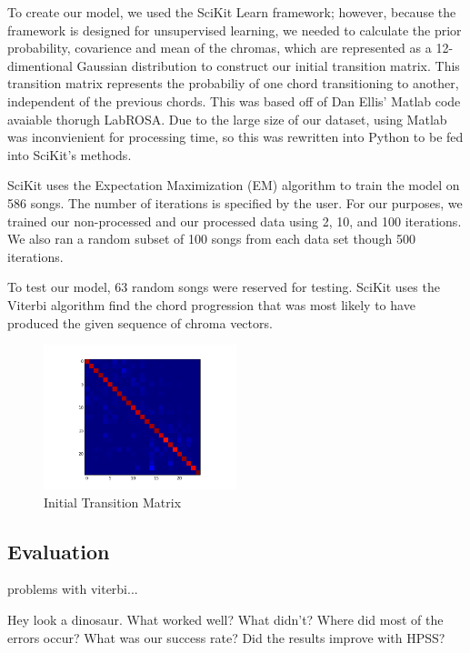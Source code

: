 \documentclass{article}
\begin{document}
To create our model, we used the SciKit Learn framework; however, because the
framework is designed for unsupervised learning, we needed to calculate the
prior probability, covarience and mean of the chromas, which are represented as
a 12-dimentional Gaussian distribution to construct our initial transition
matrix.  This transition matrix represents the probabiliy of one chord
transitioning to another, independent of the previous chords.  This was based
off of Dan Ellis' Matlab code avaiable thorugh LabROSA. Due to the large size
of our dataset, using Matlab was inconvienient for processing time, so this was
rewritten into Python to be fed into SciKit's methods.

SciKit uses the Expectation Maximization (EM) algorithm to train the model on
586 songs. The number of iterations is specified by the user. For our purposes,
we trained our non-processed and our processed data using 2, 10, and 100
iterations. We also ran a random subset of 100 songs from each data set though
500 iterations.

To test our model, 63 random songs were reserved for testing. SciKit uses the
Viterbi algorithm find the chord progression that was most likely to have
produced the given sequence of chroma vectors.


\begin{figure}
   \centering
   \includegraphics[width=0.5\textwidth]{trans-h.png}
   \caption{Initial Transition Matrix}
   \label{fig:transmath}
\end{figure}

\subsection{Evaluation}

\cite{Danellis:23} problems with viterbi...

Hey look a dinosaur.
What worked well? What didn't? Where did most of the errors occur?
What was our success rate? Did the results improve with HPSS?
\end{document}
